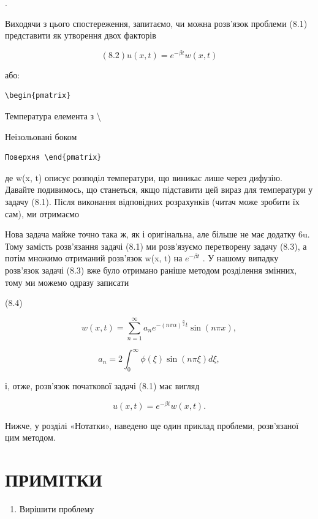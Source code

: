 \documentclass[
  ukrainian,
]{article}
\providecommand{\tightlist}{%
  \setlength{\itemsep}{0pt}\setlength{\parskip}{0pt}}
\begin{document}
.

Виходячи з цього спостереження, запитаємо, чи можна розв'язок проблеми
(8.1) представити як утворення двох факторів

\[
(8.2) u(x, t) = e^{-\beta t}w(x, t)
\]

або:

\begin{verbatim}
\begin{pmatrix}
\end{verbatim}

Температура елемента з \textbackslash{}

Неізольовані боком

\begin{verbatim}
Поверхня \end{pmatrix}
\end{verbatim}

де w(x, t) описує розподіл температури, що виникає лише через дифузію.
Давайте подивимось, що станеться, якщо підставити цей вираз для
температури у задачу (8.1). Після виконання відповідних розрахунків
(читач може зробити їх сам), ми отримаємо

Нова задача майже точно така ж, як і оригінальна, але більше не має
додатку 6u. Тому замість розв'язання задачі (8.1) ми розв'язуємо
перетворену задачу (8.3), а потім множимо отриманий розв'язок w(x, t) на
\(e^{-\beta t}\) . У нашому випадку розв'язок задачі (8.3) вже було
отримано раніше методом розділення змінних, тому ми можемо одразу
записати

(8.4)

\[
w(x, t) = \sum_{n=1}^{\infty} a_n e^{-(n\pi\alpha)^{\frac{n}{2}}t} \sin(n\pi x),
\]

\[
a_n = 2 \int_0^{\infty} \phi(\xi) \sin(n\pi \xi) d\xi,
\]

і, отже, розв'язок початкової задачі (8.1) має вигляд

\[
u(x, t) = e^{-\beta t}w(x, t).
\]

Нижче, у розділі «Нотатки», наведено ще один приклад проблеми,
розв'язаної цим методом.

\section{ПРИМІТКИ}\label{ux43fux440ux438ux43cux456ux442ux43aux438-1}

\begin{enumerate}
\def\labelenumi{\arabic{enumi}.}
\tightlist
\item
  Вирішити проблему
\end{enumerate}
\end{document}
